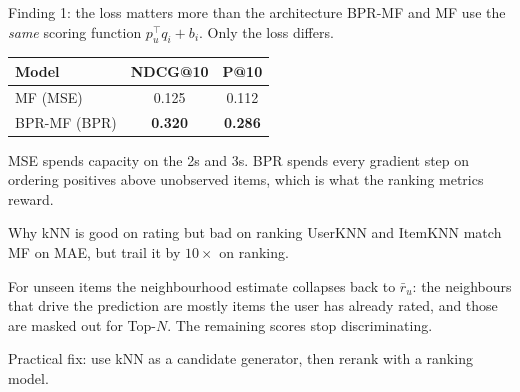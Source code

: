 \documentclass[aspectratio=169]{beamer}
\begin{document}
\begin{frame}{Finding 1: the loss matters more than the architecture}
  BPR-MF and MF use the \emph{same} scoring function $p_u^{\top}q_i+b_i$. Only the loss differs.
  \vspace{0.5em}
  \begin{center}\small
  \begin{tabular}{lcc}
    \toprule
    Model & NDCG@10 & P@10 \\
    \midrule
    MF (MSE)       & 0.125 & 0.112 \\
    BPR-MF (BPR)   & \textbf{0.320} & \textbf{0.286} \\
    \bottomrule
  \end{tabular}
  \end{center}
  \vspace{0.5em}
  MSE spends capacity on the 2s and 3s. BPR spends every gradient step on ordering positives above unobserved items, which is what the ranking metrics reward.
\end{frame}

\begin{frame}{Why kNN is good on rating but bad on ranking}
  UserKNN and ItemKNN match MF on MAE, but trail it by $10\times$ on ranking.
  \vspace{0.3em}

  For unseen items the neighbourhood estimate collapses back to $\bar r_u$: the neighbours that drive the prediction are mostly items the user has already rated, and those are masked out for Top-$N$. The remaining scores stop discriminating.
  \vspace{0.3em}

  Practical fix: use kNN as a candidate generator, then rerank with a ranking model.
\end{frame}
\end{document}
